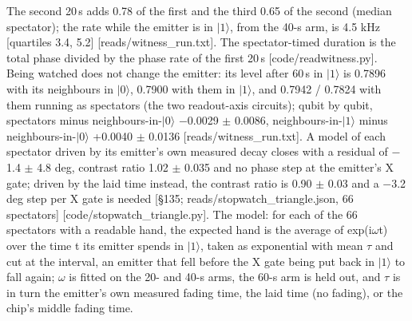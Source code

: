 \documentclass[11pt]{article}
\begin{document}
\par\smallskip{}\par\smallskip
The second 20\,\textmu s adds 0.78 of the first and the third 0.65 of the second (median spectator); the rate while the emitter is in \(|1\rangle\), from the 40-\textmu s arm, is 4.5 kHz {[}quartiles 3.4, 5.2{]} {[}reads/witness\_run.txt{]}. The spectator-timed duration is the total phase divided by the phase rate of the first 20\,\textmu s {[}code/readwitness.py{]}. Being watched does not change the emitter: its level after 60\,\textmu s in \(|1\rangle\) is 0.7896 with its neighbours in \(|0\rangle\), 0.7900 with them in \(|1\rangle\), and 0.7942 / 0.7824 with them running as spectators (the two readout-axis circuits); qubit by qubit, spectators minus neighbours-in-\(|0\rangle\) \(-\)0.0029 \(\pm\) 0.0086, neighbours-in-\(|1\rangle\) minus neighbours-in-\(|0\rangle\) +0.0040 \(\pm\) 0.0136 {[}reads/witness\_run.txt{]}. A model of each spectator driven by its emitter's own measured decay closes with a residual of \(-\)1.4 \(\pm\) 4.8 deg, contrast ratio 1.02 \(\pm\) 0.035 and no phase step at the emitter's X gate; driven by the laid time instead, the contrast ratio is 0.90 \(\pm\) 0.03 and a \(-\)3.2 deg step per X gate is needed {[}\S{}135; reads/stopwatch\_triangle.json, 66 spectators{]} {[}code/stopwatch\_triangle.py{]}. The model: for each of the 66 spectators with a readable hand, the expected hand is the average of exp(i\(\omega\)t) over the time t its emitter spends in \(|1\rangle\), taken as exponential with mean \(\tau\) and cut at the interval, an emitter that fell before the X gate being put back in \(|1\rangle\) to fall again; \(\omega\) is fitted on the 20- and 40-\textmu s arms, the 60-\textmu s arm is held out, and \(\tau\) is in turn the emitter's own measured fading time, the laid time (no fading), or the chip's middle fading time.
\end{document}
